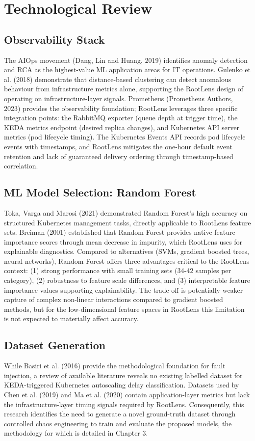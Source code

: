 \section{Technological Review}

\subsection{Observability Stack}
The AIOps movement (Dang, Lin and Huang, 2019) identifies anomaly detection and RCA as the highest-value ML application areas for IT operations. Gulenko et al. (2018) demonstrate that distance-based clustering can detect anomalous behaviour from infrastructure metrics alone, supporting the RootLens design of operating on infrastructure-layer signals. Prometheus (Prometheus Authors, 2023) provides the observability foundation; RootLens leverages three specific integration points: the RabbitMQ exporter (queue depth at trigger time), the KEDA metrics endpoint (desired replica changes), and Kubernetes API server metrics (pod lifecycle timing). The Kubernetes Events API records pod lifecycle events with timestamps, and RootLens mitigates the one-hour default event retention and lack of guaranteed delivery ordering through timestamp-based correlation.

\subsection{ML Model Selection: Random Forest}
Toka, Varga and Marosi (2021) demonstrated Random Forest's high accuracy on structured Kubernetes management tasks, directly applicable to RootLens feature sets. Breiman (2001) established that Random Forest provides native feature importance scores through mean decrease in impurity, which RootLens uses for explainable diagnostics. Compared to alternatives (SVMs, gradient boosted trees, neural networks), Random Forest offers three advantages critical to the RootLens context: (1) strong performance with small training sets (34-42 samples per category), (2) robustness to feature scale differences, and (3) interpretable feature importance values supporting explainability. The trade-off is potentially weaker capture of complex non-linear interactions compared to gradient boosted methods, but for the low-dimensional feature spaces in RootLens this limitation is not expected to materially affect accuracy.

\subsection{Dataset Generation}
While Basiri et al. (2016) provide the methodological foundation for fault injection, a review of available literature reveals no existing labelled dataset for KEDA-triggered Kubernetes autoscaling delay classification. Datasets used by Chen et al. (2019) and Ma et al. (2020) contain application-layer metrics but lack the infrastructure-layer timing signals required by RootLens. Consequently, this research identifies the need to generate a novel ground-truth dataset through controlled chaos engineering to train and evaluate the proposed models, the methodology for which is detailed in Chapter 3.


